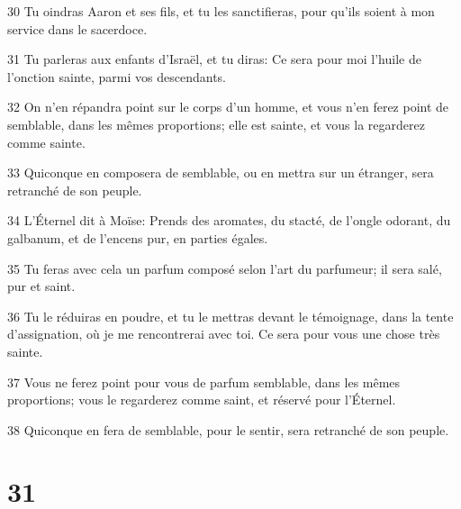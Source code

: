 \par 30 Tu oindras Aaron et ses fils, et tu les sanctifieras, pour qu'ils soient à mon service dans le sacerdoce.
\par 31 Tu parleras aux enfants d'Israël, et tu diras: Ce sera pour moi l'huile de l'onction sainte, parmi vos descendants.
\par 32 On n'en répandra point sur le corps d'un homme, et vous n'en ferez point de semblable, dans les mêmes proportions; elle est sainte, et vous la regarderez comme sainte.
\par 33 Quiconque en composera de semblable, ou en mettra sur un étranger, sera retranché de son peuple.
\par 34 L'Éternel dit à Moïse: Prends des aromates, du stacté, de l'ongle odorant, du galbanum, et de l'encens pur, en parties égales.
\par 35 Tu feras avec cela un parfum composé selon l'art du parfumeur; il sera salé, pur et saint.
\par 36 Tu le réduiras en poudre, et tu le mettras devant le témoignage, dans la tente d'assignation, où je me rencontrerai avec toi. Ce sera pour vous une chose très sainte.
\par 37 Vous ne ferez point pour vous de parfum semblable, dans les mêmes proportions; vous le regarderez comme saint, et réservé pour l'Éternel.
\par 38 Quiconque en fera de semblable, pour le sentir, sera retranché de son peuple.

\chapter{31}


